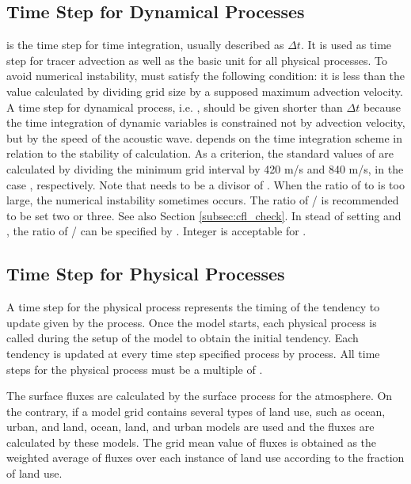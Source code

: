 \subsection{Time Step for Dynamical Processes}

 is the time step for time integration, usually described as $\Delta t$.
It is used as time step for tracer advection as well as the basic unit for all physical processes.
To avoid numerical instability,  must satisfy the following condition:
it is less than the value calculated by dividing grid size by a supposed maximum advection velocity.
A time step for dynamical process, i.e. , should be given shorter than $\Delta t$
because the time integration of dynamic variables is constrained not by advection velocity, but by the speed of the acoustic wave.
 depends on the time integration scheme in relation to the stability of calculation.
As a criterion, the standard values of  are calculated by dividing the minimum grid interval by 420 m/s and 840 m/s, in the case , respectively.
Note that  needs to be a divisor of .
When the ratio of  to  is too large,
the numerical instability sometimes occurs.
The ratio of / is recommended to be set two or three.
See also Section \ref{subsec:cfl_check}.
In stead of setting  and ,
the ratio of / can be specified by .
Integer is acceptable for .


\subsection{Time Step for Physical Processes}
A time step for the physical process represents the timing of the tendency to update given by the process. Once the model starts, each physical process is called during the setup of the model to obtain the initial tendency. Each tendency is updated at every time step specified process by process.
All time steps for the physical process must be a multiple of .

The surface fluxes are calculated by the surface process for the atmosphere.
On the contrary, if a model grid contains several types of land use, such as ocean, urban, and land,
ocean, land, and urban models are used and the fluxes are calculated by these models.
The grid mean value of fluxes is obtained as the weighted average of fluxes over each instance of land use according to the fraction of land use.

